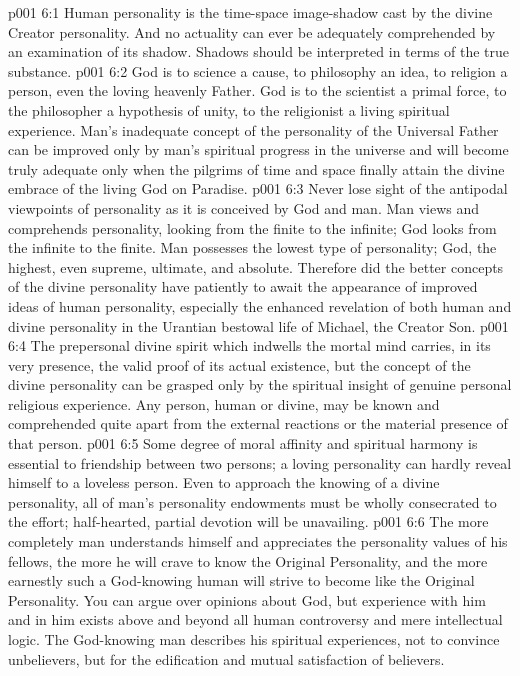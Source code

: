 \vs p001 6:1 Human personality is the time\hyp{}space image\hyp{}shadow cast by the divine Creator personality. And no actuality can ever be adequately comprehended by an examination of its shadow. Shadows should be interpreted in terms of the true substance.
\vs p001 6:2 \pc God is to science a cause, to philosophy an idea, to religion a person, even the loving heavenly Father. God is to the scientist a primal force, to the philosopher a hypothesis of unity, to the religionist a living spiritual experience. Man’s inadequate concept of the personality of the Universal Father can be improved only by man’s spiritual progress in the universe and will become truly adequate only when the pilgrims of time and space finally attain the divine embrace of the living God on Paradise.
\vs p001 6:3 Never lose sight of the antipodal viewpoints of personality as it is conceived by God and man. Man views and comprehends personality, looking from the finite to the infinite; God looks from the infinite to the finite. Man possesses the lowest type of personality; God, the highest, even supreme, ultimate, and absolute. Therefore did the better concepts of the divine personality have patiently to await the appearance of improved ideas of human personality, especially the enhanced revelation of both human and divine personality in the Urantian bestowal life of Michael, the Creator Son.
\vs p001 6:4 \pc The prepersonal divine spirit which indwells the mortal mind carries, in its very presence, the valid proof of its actual existence, but the concept of the divine personality can be grasped only by the spiritual insight of genuine personal religious experience. Any person, human or divine, may be known and comprehended quite apart from the external reactions or the material presence of that person.
\vs p001 6:5 Some degree of moral affinity and spiritual harmony is essential to friendship between two persons; a loving personality can hardly reveal himself to a loveless person. Even to approach the knowing of a divine personality, all of man’s personality endowments must be wholly consecrated to the effort; half\hyp{}hearted, partial devotion will be unavailing.
\vs p001 6:6 The more completely man understands himself and appreciates the personality values of his fellows, the more he will crave to know the Original Personality, and the more earnestly such a God\hyp{}knowing human will strive to become like the Original Personality. You can argue over opinions about God, but experience with him and in him exists above and beyond all human controversy and mere intellectual logic. The God\hyp{}knowing man describes his spiritual experiences, not to convince unbelievers, but for the edification and mutual satisfaction of believers.
